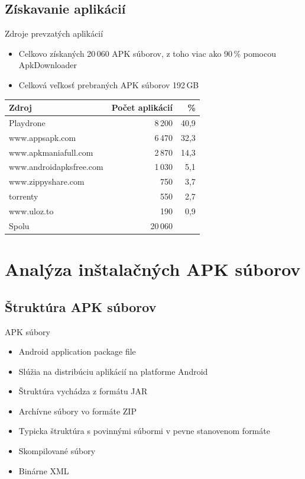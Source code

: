 \documentclass{beamer}
\begin{document}
  \subsection{Získavanie aplikácií}
   \begin{frame}[label=lists]{Zdroje prevzatých aplikácií}
	\begin{itemize}
	\item Celkovo získaných 20\,060 APK súborov, z toho viac ako 90\,\% pomocou ApkDownloader
		\item Celková veľkosť prebraných APK súborov 192\,GB
\end{itemize}	    
    
    \begin{table}[htb]
\centering
  \begin{tabular}{|l r r|}
    \hline
    \textbf{Zdroj} & \textbf{Počet aplikácií} & \textbf{\%} \\\hline\hline
    Playdrone & 8\,200 & 40,9\\
    www.appsapk.com & 6\,470 & 32,3\\
    www.apkmaniafull.com & 2\,870 & 14,3\\
    www.androidapksfree.com & 1\,030 & 5,1\\
    www.zippyshare.com & 750 & 3,7\\
    torrenty & 550 & 2,7\\
    www.uloz.to & 190 & 0,9\\
    \hline
    Spolu & 20\,060 & \\
    \hline
  \end{tabular}
  \label{tab:stahovanie}
\end{table}
  
\end{frame}  
  

\section{Analýza inštalačných APK súborov}
\subsection{Štruktúra APK súborov}
  \begin{frame}[label=lists]{APK súbory}
	\begin{itemize}
		\item Android application package file
		\item Slúžia na distribúciu aplikácií na platforme Android
		\item Štruktúra vychádza z formátu JAR
		\item Archívne súbory vo formáte ZIP
		\item Typicka štruktúra s povinnými súbormi v pevne stanovenom formáte
		\item Skompilované súbory
		\item Binárne XML

	\end{itemize}	    
 
   \end{frame} 
   
\end{document}
